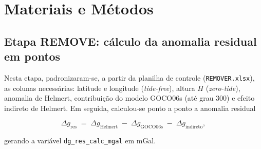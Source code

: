 




\chapter{Materiais e Métodos}

\vspace{-16pt}


\section{Etapa REMOVE: cálculo da anomalia residual em pontos}

Nesta etapa, padronizaram-se, a partir da planilha de controle (\texttt{REMOVER.xlsx}), as colunas necessárias: latitude e longitude (\emph{tide-free}), altura $H$ (\emph{zero-tide}), anomalia de Helmert, contribuição do modelo GOCO06s (até grau 300) e efeito indireto de Helmert. Em seguida, calculou-se ponto a ponto a anomalia residual

\begin{equation}
    \Delta g_{\text{res}} \;=\; \Delta g_{\text{Helmert}} \;-\; \Delta g_{\text{GOCO06s}} \;-\; \Delta g_{\text{indireto}},
\end{equation}


\noindent gerando a variável \texttt{dg\allowbreak\_res\allowbreak\_calc\allowbreak\_mgal} em mGal.

